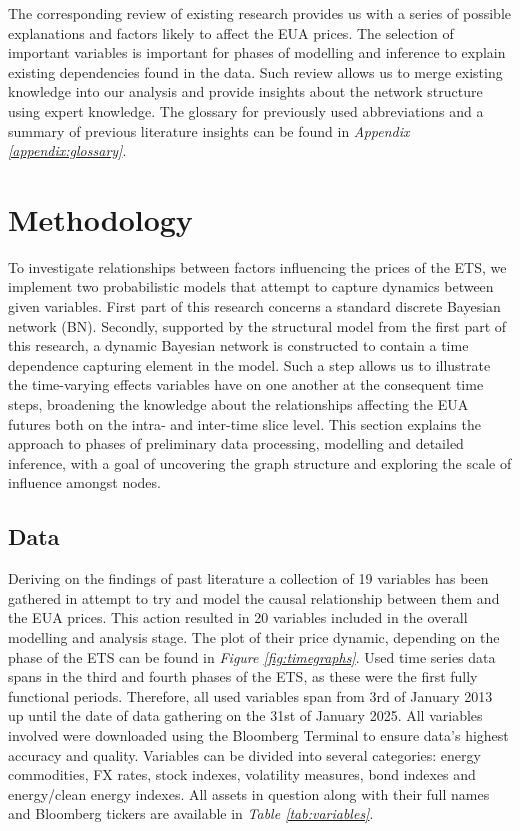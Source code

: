 \documentclass[12pt, letterpaper]{article}
\begin{document}
The corresponding review of existing research provides us with a series of possible explanations and factors likely to affect the EUA prices. The selection of important variables is important for phases of modelling and inference to explain existing dependencies found in the data. Such review allows us to merge existing knowledge into our analysis and provide insights about the network structure using expert knowledge. The glossary for previously used abbreviations and a summary of previous literature insights can be found in \textit{Appendix \ref{appendix:glossary}}.

\pagestyle{fancy}
\section{Methodology}

To investigate relationships between factors influencing the prices of the ETS, we implement two probabilistic models that attempt to capture dynamics between given variables. First part of this research concerns a standard discrete Bayesian network (BN). Secondly, supported by the structural model from the first part of this research, a dynamic Bayesian network is constructed to contain a time dependence capturing element in the model. Such a step allows us to illustrate the time-varying effects variables have on one another at the consequent time steps, broadening the knowledge about the relationships affecting the EUA futures both on the intra- and inter-time slice level. This section explains the approach to phases of preliminary data processing, modelling and detailed inference, with a goal of uncovering the graph structure and exploring the scale of influence amongst nodes.

\subsection{Data}

Deriving on the findings of past literature a collection of 19 variables has been gathered in attempt to try and model the causal relationship between them and the EUA prices. This action resulted in 20 variables included in the overall modelling and analysis stage. The plot of their price dynamic, depending on the phase of the ETS can be found in \textit{Figure \ref{fig:timegraphs}}. Used time series data spans in the third and fourth phases of the ETS, as these were the first fully functional periods. Therefore, all used variables span from 3rd of January 2013 up until the date of data gathering on the 31st of January 2025. All variables involved were downloaded using the Bloomberg Terminal to ensure data’s highest accuracy and quality. Variables can be divided into several categories: energy commodities, FX rates, stock indexes, volatility measures, bond indexes and energy/clean energy indexes. All assets in question along with their full names and Bloomberg tickers are available in \textit{Table \ref{tab:variables}}.
\end{document}
